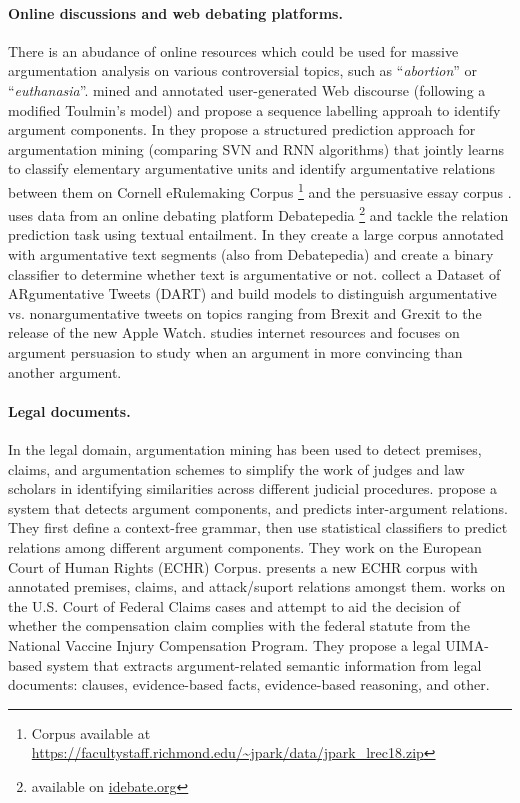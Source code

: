 \paragraph{Online discussions and web debating platforms.}
There is an abudance of online resources which could be used for
massive argumentation analysis on various controversial topics, such as 
``\emph{abortion}'' or ``\emph{euthanasia}''.
\citet{habernal2017argumentation} mined and annotated user-generated
Web discourse (following a modified Toulmin's model) and propose 
a sequence labelling approah to identify argument components. 
In \citep{niculae2017argument} they propose a structured prediction approach 
for argumentation mining (comparing SVN and RNN algorithms) that jointly
learns to classify elementary argumentative units and identify argumentative relations
between them on Cornell eRulemaking Corpus
\footnote{Corpus available at 
\url{https://facultystaff.richmond.edu/~jpark/data/jpark_lrec18.zip}}
and the persuasive essay corpus \citep{stab2017parsing}.
\citet{cabrio2012combining} uses data from an online debating platform Debatepedia 
\footnote{available on \url{idebate.org}} and tackle the relation 
prediction task using textual entailment. 
In \citep{al2016cross} they create a large corpus annotated with argumentative
text segments (also from Debatepedia) and create a binary classifier to determine
whether text is argumentative or not. \citet{dusmanu2017argument} collect 
a Dataset of ARgumentative Tweets (DART) and build models to distinguish argumentative
vs. nonargumentative tweets on topics ranging from Brexit and Grexit to 
the release of the new Apple Watch. 
\citet{habernal2016argument} studies internet resources and 
focuses on argument persuasion to study when
an argument in more convincing than another argument. 

\paragraph{Legal documents. } 
In the legal domain, argumentation mining has been used to detect
premises, claims, and argumentation schemes to simplify
the work of judges and law scholars in identifying similarities 
across different judicial procedures. 
\citet{palau2009argumentation} propose a system that detects argument components, 
and predicts inter-argument relations. They first define a context-free
grammar, then use statistical classifiers to predict relations among different 
argument components. They work on the European Court of Human Rights (ECHR) Corpus.
\citet{teruel2018increasing} presents a new ECHR corpus with annotated 
premises, claims, and attack/suport relations amongst them.
\citet{grabmair2015introducing} works on the U.S. Court of Federal Claims
cases and attempt to aid the decision of whether the compensation claim
complies with the federal statute from the National Vaccine Injury Compensation
Program. They propose a legal UIMA-based \citep{ferrucci2004uima} system 
that extracts argument-related semantic information from legal documents: clauses,
evidence-based facts, evidence-based reasoning, and other. 

